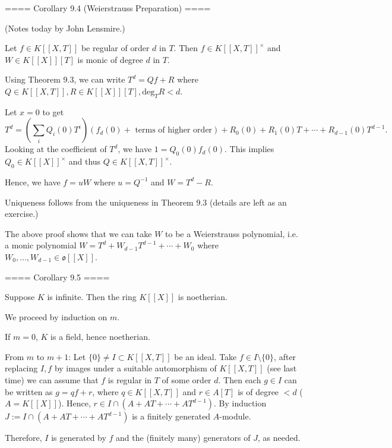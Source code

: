 

==== Corollary 9.4 (Weierstrauss Preparation) ====

(Notes today by John Lensmire.)

Let $f\in K[[X,T]]$ be regular of order $d$ in $T$.
Then $f\in K[[X,T]]^\times$ and $W\in K[[X]][T]$ is monic of degree $d$ in $T$.


Using Theorem 9.3, we can write $T^d = Qf+R$ where $Q\in K[[X,T]], R\in K[[X]][T], \mathrm{deg}_TR < d$.

Let $x=0$ to get
$$T^d = \left( \sum_i Q_i(0) T^i \right) (f_d(0) + \textrm{ terms of higher order} )
+ R_0(0) + R_1(0) T + \cdots + R_{d-1}(0) T^{d-1}.$$
Looking at the coefficient of $T^d$, we have $1 = Q_0(0) f_d(0)$.
This implies $Q_0 \in K[[X]]^\times$ and thus $Q\in K[[X,T]]^\times$.

Hence, we have $f = uW$ where $u = Q^{-1}$ and $W = T^d - R$.

Uniqueness follows from the uniqueness in Theorem 9.3 (details are left as an exercise.)


The above proof shows that we can take $W$ to be a Weierstrauss polynomial, i.e. a monic polynomial
$W = T^d + W_{d-1} T^{d-1} + \cdots + W_0$ where $W_0,\ldots, W_{d-1}\in \mathfrak{o}[[X]]$.

==== Corollary 9.5 ====

Suppose $K$ is infinite. Then the ring $K[[X]]$ is noetherian.


We proceed by induction on $m$.

If $m=0$, $K$ is a field, hence noetherian.

From $m$ to $m+1$:
Let $\{0\} \neq I \subset K[[X,T]]$ be an ideal.
Take $f\in I\setminus \{0\}$, after replacing $I,f$ by images under a suitable automorphism of $K[[X,T]]$
(see last time) we can assume that $f$ is regular in $T$ of some order $d$.
Then each $g\in I$ can be written as $g = qf + r$, where $q\in K[[X,T]]$ and $r\in A[T]$ is of degree $<d$ ($A = K[[X]]$).
Hence, $r\in I \cap (A + AT + \cdots + AT^{d-1})$. By induction $J:= I\cap (A + AT + \cdots + AT^{d-1})$ is a finitely generated $A$-module.

Therefore, $I$ is generated by $f$ and the (finitely many) generators of $J$, as needed.

